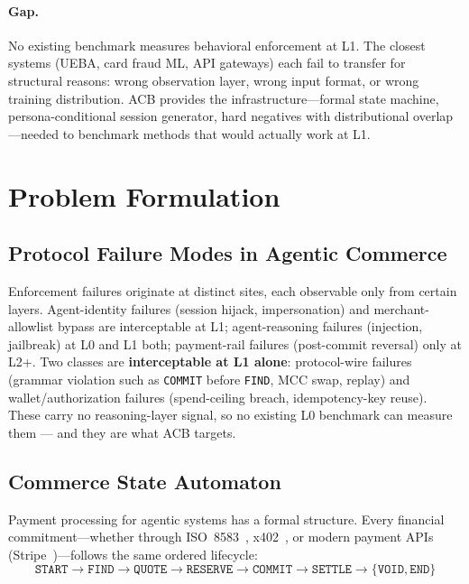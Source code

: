 \documentclass{article}
\begin{document}
\paragraph{Gap.}
No existing benchmark measures behavioral enforcement at L1. The closest systems
(UEBA, card fraud ML, API gateways) each fail to transfer for structural reasons:
wrong observation layer, wrong input format, or wrong training distribution.
ACB provides the infrastructure---formal state machine, persona-conditional
session generator, hard negatives with distributional overlap---needed to benchmark
methods that would actually work at L1.

\section{Problem Formulation}
\label{sec:formulation}

\subsection{Protocol Failure Modes in Agentic Commerce}

Enforcement failures originate at distinct sites, each observable only from certain
layers. Agent-identity failures (session hijack, impersonation) and merchant-allowlist
bypass are interceptable at L1; agent-reasoning failures (injection, jailbreak) at L0 and
L1 both; payment-rail failures (post-commit reversal) only at L2+. Two classes are
\textbf{interceptable at L1 alone}: protocol-wire failures (grammar violation such as
\texttt{COMMIT} before \texttt{FIND}, MCC swap, replay) and wallet/authorization failures
(spend-ceiling breach, idempotency-key reuse). These carry no reasoning-layer signal, so no
existing L0 benchmark can measure them --- and they are what ACB targets.


\subsection{Commerce State Automaton}
\label{sec:automaton}

Payment processing for agentic systems has a formal structure. Every financial
commitment---whether through ISO~8583~\cite{iso8583}, x402~\cite{x402}, or
modern payment APIs (Stripe~\cite{stripe})---follows the same ordered lifecycle:
\[
\texttt{START} \to \texttt{FIND} \to \texttt{QUOTE} \to \texttt{RESERVE} \to
\texttt{COMMIT} \to \texttt{SETTLE} \to \{\texttt{VOID}, \texttt{END}\}
\]
\end{document}
